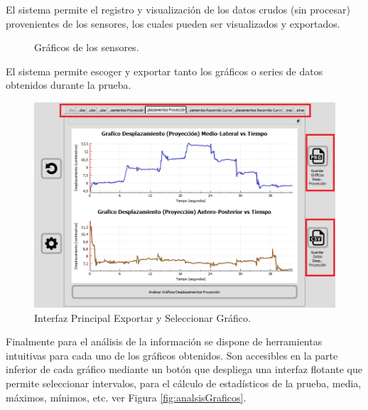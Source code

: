 \documentclass[12pt,a4paper]{article}
\begin{document}
\newpage El sistema permite el registro y visualización de los datos crudos (sin procesar) provenientes de los sensores, los cuales pueden ser visualizados y exportados.

\begin{figure}[H]
	\centering
	\caption{Gráficos de los sensores.}
	\label{fig:Graficosensores}
\end{figure}

El sistema permite escoger y exportar tanto los gráficos o series de datos obtenidos durante la prueba. 
\begin{figure}[H]
	\centering
	\includegraphics[scale=0.53]{images/graficosyreportes/graficos}
	\caption{Interfaz Principal Exportar y Seleccionar Gráfico.}
	\label{fig:exportargrafico}
\end{figure}

Finalmente para el análisis de la información se dispone de herramientas intuitivas para cada uno de los gráficos obtenidos.
Son accesibles en la parte inferior de cada gráfico mediante un botón que despliega una interfaz flotante que permite seleccionar intervalos, para el cálculo de estadísticos de la prueba, media, máximos, mínimos, etc. ver Figura \ref{fig:analsisGraficos}.
\end{document}
